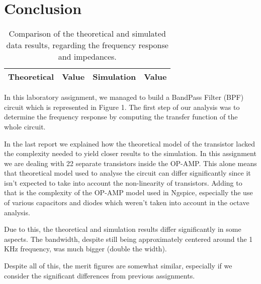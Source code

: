 \section{Conclusion}
\label{sec:conclusion}
\par
\begin{table}[!h]
  \centering
  \begin{tabular}{c c c c}
    \hline    
    {\bf Theoretical} & {\bf Value} & {\bf Simulation} & {\bf Value}\\ \hline
     
  \end{tabular}
  \caption{Comparison of the theoretical and simulated data results, regarding the frequency response and impedances.}
  \label{tab:comp}
\end{table}

In this laboratory assignment, we managed to build a BandPass Filter (BPF) circuit which is represented in Figure 1. The first step of our analysis was to determine the frequency response by computing the transfer function of the whole circuit.

In the last report we explained how the theoretical model of the transistor lacked the complexity needed to yield closer results to the simulation. In this assignment we are dealing with 22 separate transistors inside the OP-AMP. This alone means that theoretical model used to analyse the circuit can differ significantly since it isn't expected to take into account the non-linearity of transistors. Adding to that is the complexity of the OP-AMP model used in Ngspice, especially the use of various capacitors and diodes which weren't taken into account in the octave analysis.

Due to this, the theoretical and simulation results differ significantly in some aspects. 
The bandwidth, despite still being approximately centered around the 1 KHz frequency, was much bigger (double the width).


Despite all of this, the merit figures are somewhat similar, especially if we consider the significant differences from previous assignments.
